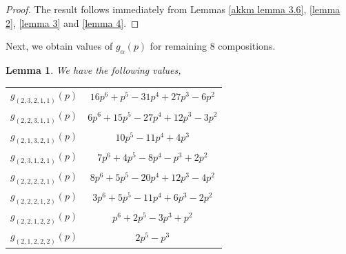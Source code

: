 \documentclass[a4paper]{amsart}
\newtheorem{lemma}[theorem]{Lemma}
\numberwithin{equation}{section}
\theoremstyle{remark}
\begin{document}
\begin{proof}
    The result follows immediately from Lemmas \ref{akkm lemma 3.6}, \ref{lemma 2}, \ref{lemma 3} and \ref{lemma 4}.
\end{proof}
Next, we obtain values of $g_{\alpha}(p)$ for remaining $8$ compositions.
\begin{lemma}
We have the following values,
\begin{table}[H]
\centering
 \begin{tabular}{c c} 
 \hline
 $g_{(2,3,2,1,1)}(p)$ & $16p^6+p^5-31p^4+27p^3-6p^2$\\ 
 $g_{(2,2,3,1,1)}(p)$ & $6p^6+15p^5-27p^4+12p^3-3p^2$\\ 
 $g_{(2,1,3,2,1)}(p)$ & $10 p^5 - 11 p^4 + 4 p^3$\\
 $g_{(2,3,1,2,1)}(p)$ & $7p^6+4p^5-8p^4-p^3+2p^2$\\
 $g_{(2,2,2,2,1)}(p)$ & $8p^6+5p^5-20p^4+12p^3-4p^2$\\
 $g_{(2,2,2,1,2)}(p)$ & $3p^6+5p^5-11p^4+6p^3-2p^2$\\
 $g_{(2,2,1,2,2)}(p)$ & $p^6+2p^5-3p^3+p^2$\\
 $g_{(2,1,2,2,2)}(p)$ & $2 p^5 - p^3$\\

\hline
\end{tabular}
\end{table}
\end{lemma}
\end{document}
